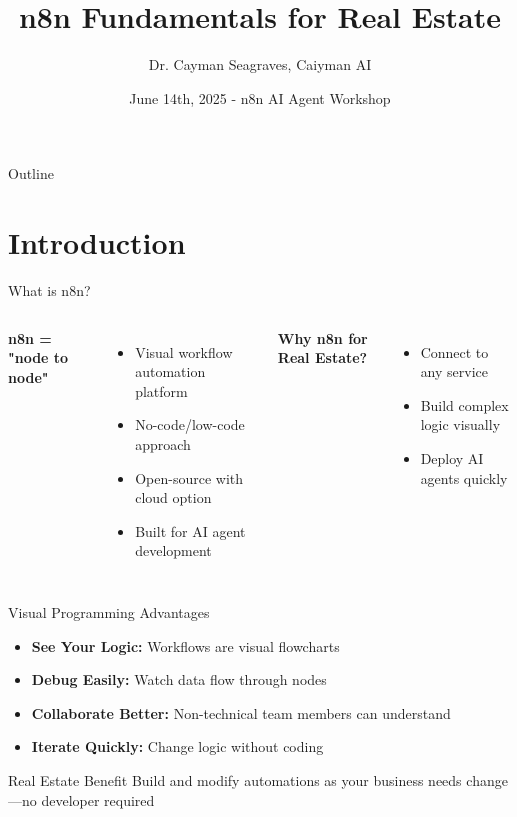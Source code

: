 \documentclass{beamer}
\author{Dr. Cayman Seagraves, Caiyman AI}
\date{June 14th, 2025 - n8n AI Agent Workshop}
\title{n8n Fundamentals for Real Estate}
\begin{document}
{
\begin{frame}
    \titlepage
\end{frame}
}

\begin{frame}{Outline}
    \tableofcontents
\end{frame}

\section{Introduction}

\begin{frame}{What is n8n?}
  \begin{columns}[onlytextwidth]
      \textbf{n8n = "node to node"}
      \begin{itemize}
        \item Visual workflow automation platform
        \item No-code/low-code approach
        \item Open-source with cloud option
        \item Built for AI agent development
      \end{itemize}
      
      \vspace{0.3cm}
      \textbf{Why n8n for Real Estate?}
      \begin{itemize}
        \item Connect to any service
        \item Build complex logic visually
        \item Deploy AI agents quickly
      \end{itemize}
  \end{columns}
\end{frame}

\begin{frame}{Visual Programming Advantages}
  \begin{itemize}
    \item \textbf{See Your Logic:} Workflows are visual flowcharts
    \item \textbf{Debug Easily:} Watch data flow through nodes
    \item \textbf{Collaborate Better:} Non-technical team members can understand
    \item \textbf{Iterate Quickly:} Change logic without coding
  \end{itemize}
  
  \vspace{0.5cm}
  
  \begin{block}{Real Estate Benefit}
    Build and modify automations as your business needs change—no developer required
  \end{block}
\end{frame}
\end{document}
